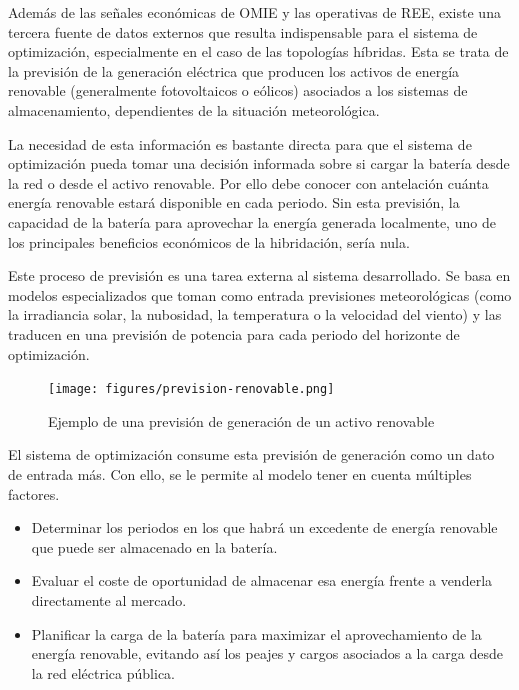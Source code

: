 Además de las señales económicas de OMIE y las operativas de REE, existe una tercera fuente de datos externos que resulta indispensable para el sistema de optimización, especialmente en el caso de las topologías híbridas. Esta se trata de la previsión de la generación eléctrica que producen los activos de energía renovable (generalmente fotovoltaicos o eólicos) asociados a los sistemas de almacenamiento, dependientes de la situación meteorológica.

La necesidad de esta información es bastante directa para que el sistema de optimización pueda tomar una decisión informada sobre si cargar la batería desde la red o desde el activo renovable. Por ello debe conocer con antelación cuánta energía renovable estará disponible en cada periodo. Sin esta previsión, la capacidad de la batería para aprovechar la energía generada localmente, uno de los principales beneficios económicos de la hibridación, sería nula.

Este proceso de previsión es una tarea externa al sistema desarrollado. Se basa en modelos especializados que toman como entrada previsiones meteorológicas (como la irradiancia solar, la nubosidad, la temperatura o la velocidad del viento) y las traducen en una previsión de potencia para cada periodo del horizonte de optimización.

\begin{figure}
  \centering
  \texttt{[image: figures/prevision-renovable.png]}
  \caption{Ejemplo de una previsión de generación de un activo renovable}
  \label{fig:prevision-renovable}
\end{figure}

El sistema de optimización consume esta previsión de generación como un dato de entrada más. Con ello, se le permite al modelo tener en cuenta múltiples factores.

\begin{itemize}

  \item Determinar los periodos en los que habrá un excedente de energía renovable que puede ser almacenado en la batería.

  \item Evaluar el coste de oportunidad de almacenar esa energía frente a venderla directamente al mercado.

  \item Planificar la carga de la batería para maximizar el aprovechamiento de la energía renovable, evitando así los peajes y cargos asociados a la carga desde la red eléctrica pública.

\end{itemize}

